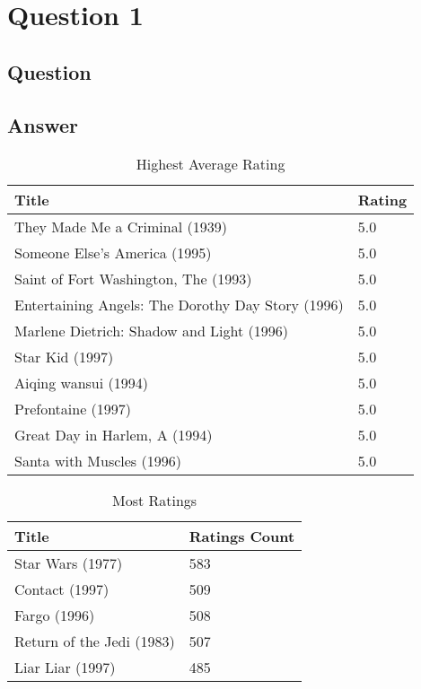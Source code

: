 \section{Question 1}

\subsection{Question}


\subsection{Answer}
\cite{py:numpy}


% 

\begin{table}[h!]
\centering
\begin{tabular}{| l | l |}
\hline
Title & Rating \\
\hline
They Made Me a Criminal (1939) & 5.0 \\
Someone Else's America (1995) & 5.0 \\
Saint of Fort Washington, The (1993) & 5.0 \\
Entertaining Angels: The Dorothy Day Story (1996) & 5.0 \\
Marlene Dietrich: Shadow and Light (1996)  & 5.0 \\
Star Kid (1997) & 5.0 \\
Aiqing wansui (1994) & 5.0 \\
Prefontaine (1997) & 5.0 \\
Great Day in Harlem, A (1994) & 5.0 \\
Santa with Muscles (1996) & 5.0 \\
\hline
\end{tabular}
\caption{Highest Average Rating}
\label{tab:hiavgrat}
\end{table}

\begin{table}[h!]
\centering
\begin{tabular}{| l | l |}
\hline
Title & Ratings Count \\
\hline
Star Wars (1977) & 583 \\
Contact (1997) & 509 \\
Fargo (1996) & 508 \\
Return of the Jedi (1983) & 507 \\
Liar Liar (1997) & 485 \\
\hline
\end{tabular}
\caption{Most Ratings}
\label{tab:mratings}
\end{table}

